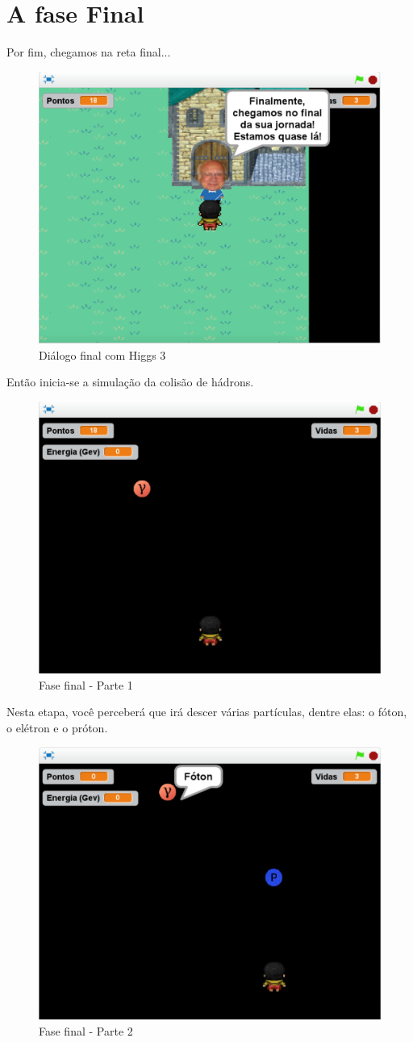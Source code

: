 \documentclass[12pt,fleqn]{book} %
\begin{document}
\section{A fase Final}
Por fim, chegamos na reta final...

\begin{figure}[h]
	\centering
	\includegraphics[width=0.65 \textwidth]{Produto/jogo_19}
	\caption{Diálogo final com Higgs 3}
	\label{fig:app_a:jogo19}
\end{figure}

Então inicia-se a simulação da colisão de hádrons.

\begin{figure}[h]
	\centering
	\includegraphics[width=0.65 \textwidth]{Produto/final1}
	\caption{Fase final - Parte 1}
	\label{fig:app_a:final1}
\end{figure}

\newpage

Nesta etapa, você perceberá que irá descer várias partículas, dentre elas: o fóton, o elétron e o próton.

\begin{figure}[h]
	\centering
	\includegraphics[width=0.65 \textwidth]{Produto/final2}
	\caption{Fase final - Parte 2}
	\label{fig:app_a:final2}
\end{figure}
\end{document}
